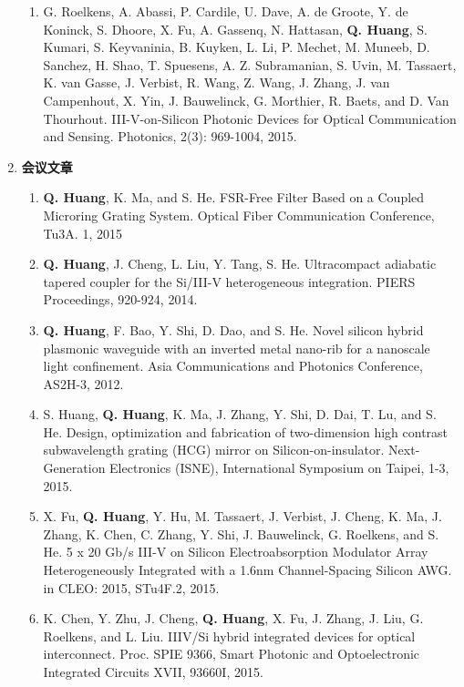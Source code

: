 \begin{publications}
\begin{enumerate}[]
\begin{enumerate}[1.]
		\item G. Roelkens, A. Abassi, P. Cardile, U. Dave, A. de Groote, Y. de Koninck, S. Dhoore, X. Fu, A. Gassenq, N. Hattasan, \textbf{Q. Huang}, S. Kumari, S. Keyvaninia, B. Kuyken, L. Li, P. Mechet, M. Muneeb, D. Sanchez, H. Shao, T. Spuesens, A. Z. Subramanian, S. Uvin, M. Tassaert, K. van Gasse, J. Verbist, R. Wang, Z. Wang, J. Zhang, J. van Campenhout, X. Yin, J. Bauwelinck, G. Morthier, R. Baets, and D. Van Thourhout. III-V-on-Silicon Photonic Devices for Optical Communication and Sensing. Photonics, 2(3): 969-1004, 2015.
	\end{enumerate}
	\item \textbf{会议文章}
	\begin{enumerate}[1.]
		\item \textbf{Q. Huang}, K. Ma, and S. He. FSR-Free Filter Based on a Coupled Microring Grating System. Optical Fiber Communication Conference, Tu3A. 1, 2015 
		\item \textbf{Q. Huang}, J. Cheng, L. Liu, Y. Tang, S. He. Ultracompact adiabatic tapered coupler for the Si/III-V heterogeneous integration. PIERS Proceedings, 920-924, 2014.
		\item \textbf{Q. Huang}, F. Bao, Y. Shi, D. Dao, and S. He. Novel silicon hybrid plasmonic waveguide with an inverted metal nano-rib for a nanoscale light confinement. Asia Communications and Photonics Conference, AS2H-3, 2012.
		\item S. Huang, \textbf{Q. Huang}, K. Ma, J. Zhang, Y. Shi, D. Dai, T. Lu, and S. He. Design, optimization and fabrication of two-dimension high contrast subwavelength grating (HCG) mirror on Silicon-on-insulator. Next-Generation Electronics (ISNE), International Symposium on Taipei, 1-3, 2015.
		\item X. Fu, \textbf{Q. Huang}, Y. Hu, M. Tassaert, J. Verbist, J. Cheng, K. Ma, J. Zhang, K. Chen, C. Zhang, Y. Shi, J. Bauwelinck, G. Roelkens, and S. He. 5 x 20 Gb/s III-V on Silicon Electroabsorption Modulator Array Heterogeneously Integrated with a 1.6nm Channel-Spacing Silicon AWG. in CLEO: 2015, STu4F.2, 2015.		
		\item K. Chen, Y. Zhu, J. Cheng, \textbf{Q. Huang}, X. Fu, J. Zhang, J. Liu, G. Roelkens, and L. Liu. IIIV/Si hybrid integrated devices for optical interconnect. Proc. SPIE 9366, Smart Photonic and Optoelectronic Integrated Circuits XVII, 93660I, 2015.
	\end{enumerate}
\end{enumerate}
\end{publications}
